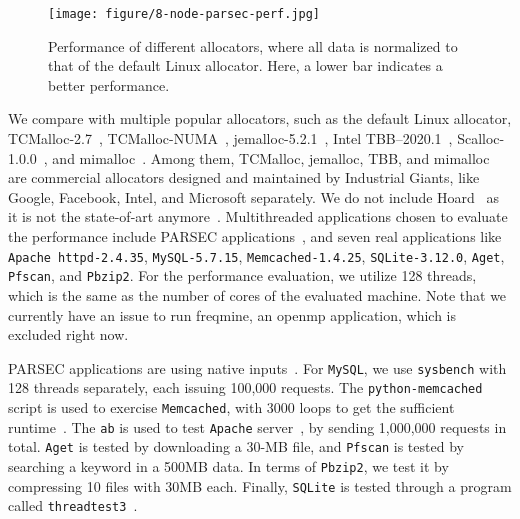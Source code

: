 \label{sec:performance}
\begin{figure}[!ht]
    \centering

    \texttt{[image: figure/8-node-parsec-perf.jpg]}
    \caption{Performance of different allocators, where all data is normalized to \\ that of the default Linux allocator. Here, a lower bar indicates a better performance.
    \label{fig:perf}}
 \end{figure}
 We compare \NM{} with multiple popular allocators, such as the default Linux allocator, TCMalloc-2.7~\cite{tcmalloc},  TCMalloc-NUMA~\cite{tcmallocnew}, jemalloc-5.2.1~\cite{jemalloc}, Intel TBB--2020.1~\cite{tbb}, Scalloc-1.0.0~\cite{Scalloc}, and mimalloc~\cite{mimalloc}. Among them, TCMalloc, jemalloc, TBB, and mimalloc are commercial allocators designed and maintained by Industrial Giants, like Google, Facebook, Intel, and Microsoft separately. We do not include Hoard~\cite{Hoard} as it is not the state-of-art anymore~\cite{Scalloc, mimalloc}. Multithreaded applications chosen to evaluate the performance include PARSEC applications~\cite{parsec}, and seven real applications like \texttt{Apache httpd-2.4.35}, \texttt{MySQL-5.7.15}, \texttt{Memcached-1.4.25}, \texttt{SQLite-3.12.0}, \texttt{Aget}, \texttt{Pfscan}, and \texttt{Pbzip2}. For the performance evaluation, we utilize 128 threads, which is the same as the number of cores of the evaluated machine. Note that we currently have an issue to run freqmine, an openmp application, which is excluded right now. 
 
PARSEC applications are using native inputs~\cite{parsec}. For \texttt{MySQL}, we use \texttt{sysbench} with 128 threads separately, each issuing 100,000 requests. The \texttt{python-memcached} script is used to exercise \texttt{Memcached}, with 3000 loops to get the sufficient runtime~\cite{memcached}. The \texttt{ab} is used to test \texttt{Apache} server~\cite{apachetest}, by sending 1,000,000 requests in total. \texttt{Aget} is tested by downloading a 30-MB file, and \texttt{Pfscan} is tested by searching  a keyword in a 500MB data. In terms of \texttt{Pbzip2}, we test it by compressing 10 files with 30MB each. Finally, \texttt{SQLite} is tested through a program called \texttt{threadtest3}~\cite{sqlitetest}. 


